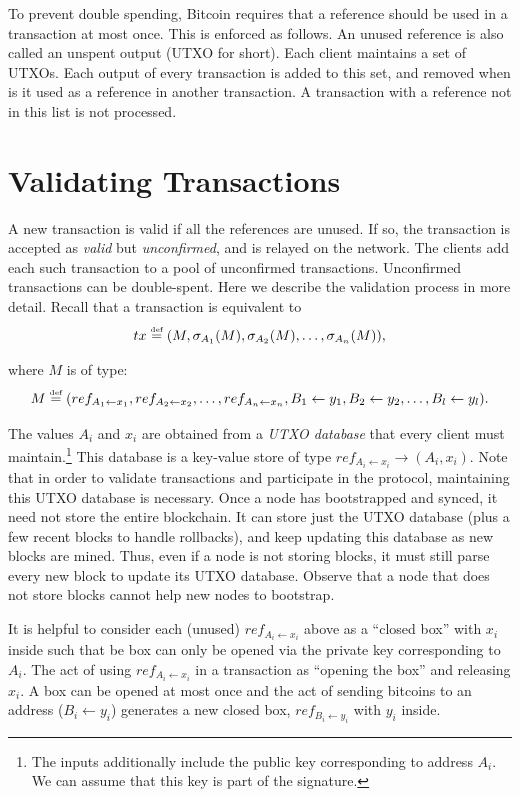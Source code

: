 \documentclass[]{report}   %
\newcommand{\sr}{\stackrel}
\newcommand{\ra}{\rightarrow}
\newcommand{\la}{\leftarrow}
\newcommand{\defined}{\stackrel{\mbox{\tiny{def}}}{=}}
\newcommand{\lea}{\leftarrow}
\begin{document}
To prevent double spending, Bitcoin requires that a reference should be used in a transaction at most once. This is enforced as follows.
An unused reference is also called an unspent output (UTXO for short). Each client maintains a set of UTXOs.
Each output of every transaction is added to this set, and removed when is it used as a reference in another transaction.
A transaction with a reference not in this list is not processed.

\section{Validating Transactions}


A new transaction is valid if all the references are unused. If so, the transaction is accepted as {\em valid} but {\em unconfirmed}, and is relayed on the network. The clients add each such transaction to a pool of unconfirmed transactions. Unconfirmed transactions can be double-spent. Here we describe the validation process in more detail.
Recall that a transaction is equivalent to 
$$tx\defined (M, \sigma_{A_1}(M), \sigma_{A_2}(M), \ldots, \sigma_{A_n}(M)),$$ 

where $M$ is of type:
\[
M \defined (ref_{A_1\leftarrow x_1}, ref_{A_2\leftarrow x_2}, \ldots, ref_{A_n\leftarrow x_n}, B_1\la y_1,
B_2\la y_2, \ldots, B_l\la y_l).
\] 

The values $A_i$ and $x_i$ are obtained from a {\em UTXO database} that every client must maintain.\footnote{The inputs additionally include the public key corresponding to address $A_i$. We can assume that this key is part of the signature.} 
This database is a key-value store of type $ref_{A_i \leftarrow x_i} \ra (A_i, x_i)$. Note that in order to validate transactions and participate in the protocol, maintaining this UTXO database is necessary. Once a node has bootstrapped and synced, it need not store the entire blockchain. It can store just the UTXO database (plus a few recent blocks to handle rollbacks), and keep updating this database as new blocks are mined. Thus, even if a node is not storing blocks, it must still parse every new block to update its UTXO database. Observe that a node that does not store blocks cannot help new nodes to bootstrap.


It is helpful to consider each (unused) $ref_{A_i \lea x_i}$
above as a ``closed box'' with $x_i$ inside such that be box can only be opened via the private key corresponding to $A_i$. The act of using $ref_{A_i \lea x_i}$ in a transaction as ``opening the box'' and releasing $x_i$. A box can be opened at most once and the act of sending bitcoins to an address ($B_i\la y_i$) generates a new closed box, $ref_{B_i\lea y_i}$ with $y_i$ inside. 
\end{document}
